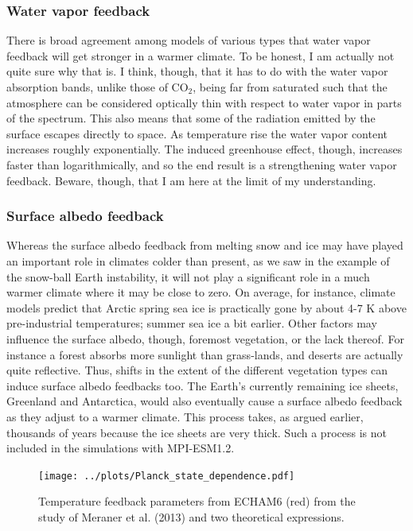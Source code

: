 \documentclass[12pt]{book}
\begin{document}
\subsubsection{Water vapor feedback}
There is broad agreement among models of various types that water vapor feedback will get stronger in a warmer climate. 
To be honest, I am actually not quite sure why that is. 
I think, though, that it has to do with the water vapor absorption bands, unlike those of CO$_2$, being far from saturated such that the atmosphere can be considered optically thin with respect to water vapor in parts of the spectrum. This also means that some of the radiation emitted by the surface escapes directly to space. As temperature rise the water vapor content increases roughly exponentially. The induced greenhouse effect, though, increases faster than logarithmically, and so the end result is a strengthening water vapor feedback. 
Beware, though, that I am here at the limit of my understanding. 




\subsubsection{Surface albedo feedback}
Whereas the surface albedo feedback from melting snow and ice may have played an important role in climates colder than present, as we saw in the example of the snow-ball Earth instability, it will not play a significant role in a much warmer climate where it may be close to zero. On average, for instance, climate models predict that Arctic spring sea ice is practically gone by about 4-7 K above pre-industrial temperatures; summer sea ice a bit earlier. 
Other factors may influence the surface albedo, though, foremost vegetation, or the lack thereof. For instance a forest absorbs more sunlight than grass-lands, and deserts are actually quite reflective. Thus, shifts in the extent of the different vegetation types can induce surface albedo feedbacks too.
The Earth's currently remaining ice sheets, Greenland and Antarctica, would also eventually cause a surface albedo feedback as they adjust to a warmer climate. This process takes, as argued earlier, thousands of years because the ice sheets are very thick. Such a process is not included in the simulations with MPI-ESM1.2.

\begin{figure}
\begin{center}
\texttt{[image: ../plots/Planck\_state\_dependence.pdf]}
\end{center}
\caption{ Temperature feedback parameters from ECHAM6 (red) from the study of Meraner et al. (2013) and two theoretical expressions. } 
\label{fig:planck_state_dependence}
\end{figure}
\end{document}
